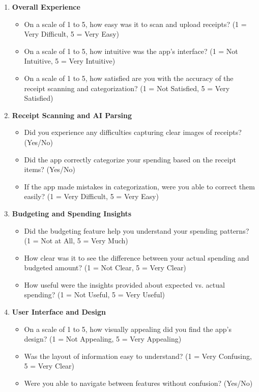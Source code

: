 \documentclass[12pt, titlepage]{article}
\begin{document}
\begin{enumerate}
    \item \textbf{Overall Experience}
    \begin{itemize}
        \item On a scale of 1 to 5, how easy was it to scan and upload receipts? (1 = Very Difficult, 5 = Very Easy)
        \item On a scale of 1 to 5, how intuitive was the app’s interface? (1 = Not Intuitive, 5 = Very Intuitive)
        \item On a scale of 1 to 5, how satisfied are you with the accuracy of the receipt scanning and categorization? (1 = Not Satisfied, 5 = Very Satisfied)
    \end{itemize}

    \item \textbf{Receipt Scanning and AI Parsing}
    \begin{itemize}
        \item Did you experience any difficulties capturing clear images of receipts? (Yes/No)
        \item Did the app correctly categorize your spending based on the receipt items? (Yes/No)
        \item If the app made mistakes in categorization, were you able to correct them easily? (1 = Very Difficult, 5 = Very Easy)
    \end{itemize}
    
    \item \textbf{Budgeting and Spending Insights}
    \begin{itemize}
        \item Did the budgeting feature help you understand your spending patterns? (1 = Not at All, 5 = Very Much)
        \item How clear was it to see the difference between your actual spending and budgeted amount? (1 = Not Clear, 5 = Very Clear)
        \item How useful were the insights provided about expected vs. actual spending? (1 = Not Useful, 5 = Very Useful)
    \end{itemize}
    
    \item \textbf{User Interface and Design}
    \begin{itemize}
        \item On a scale of 1 to 5, how visually appealing did you find the app’s design? (1 = Not Appealing, 5 = Very Appealing)
        \item Was the layout of information easy to understand? (1 = Very Confusing, 5 = Very Clear)
        \item Were you able to navigate between features without confusion? (Yes/No)
    \end{itemize}


\end{enumerate}
\end{document}
